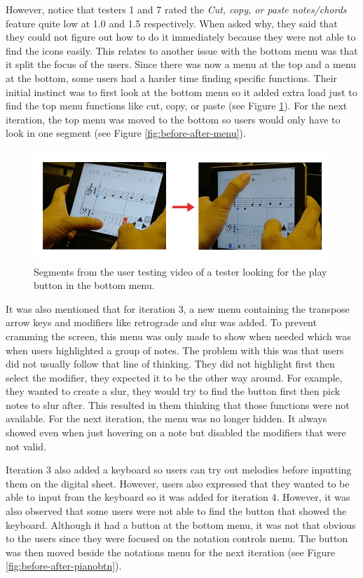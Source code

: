 				However, notice that testers 1 and 7 rated the \textit{Cut, copy, or paste notes/chords} feature quite low at 1.0 and 1.5 respectively. When asked why, they said that they could not figure out how to do it immediately because they were not able to find the icons easily. This relates to another issue with the bottom menu was that it split the focus of the users. Since there was now a menu at the top and a menu at the bottom, some users had a harder time finding specific functions. Their initial instinct was to first look at the bottom menu so it added extra load just to find the top menu functions like cut, copy, or paste (see Figure \ref{fig:video_menu}). For the next iteration, the top menu was moved to the bottom so users would only have to look in one segment (see Figure \ref{fig:before-after-menu}). 

				\begin{figure}[h]
					\centering
					\includegraphics[scale=0.5]{figures/video_menu.png}
				    \caption{Segments from the user testing video of a tester looking for the play button in the bottom menu.}
				    \label{fig:video_menu}
				\end{figure}

				It was also mentioned that for iteration 3, a new menu containing the transpose arrow keys and modifiers like retrograde and slur was added. To prevent cramming the screen, this menu was only made to show when needed which was when users highlighted a group of notes. The problem with this was that users did not usually follow that line of thinking. They did not highlight first then select the modifier, they expected it to be the other way around. For example, they wanted to create a slur, they would try to find the button first then pick notes to slur after. This resulted in them thinking that those functions were not available. For the next iteration, the menu was no longer hidden. It always showed even when just hovering on a note but disabled the modifiers that were not valid. 

				Iteration 3 also added a keyboard so users can try out melodies before inputting them on the digital sheet. However, users also expressed that they wanted to be able to input from the keyboard so it was added for iteration 4. However, it was also observed that some users were not able to find the button that showed the keyboard. Although it had a button at the bottom menu, it was not that obvious to the users since they were focused on the notation controls menu. The button was then moved beside the notations menu for the next iteration (see Figure \ref{fig:before-after-pianobtn}). 

